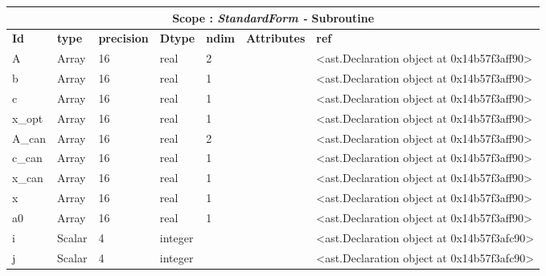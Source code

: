 \documentclass{report}
\begin{document}
\begin{center}
\begin{longtable}{|p{3.5cm}|p{1.5cm}|p{1.5cm}|p{1.5cm}|p{1cm}|p{2cm}|p{4cm}| }
\hline
\multicolumn{7}{|c|}{\textbf{Scope : \qquad}  \textbf{\textit{StandardForm - }Subroutine}}\\ 
\hline
\textbf{Id} & \textbf{type} & \textbf{precision} & \textbf{Dtype} & \textbf{ndim} & \textbf{Attributes} & \textbf{ref} \\\hline

A & Array & 16 & real & 2 &  & <ast.Declaration object at 0x14b57f3aff90> \\\hline

b & Array & 16 & real & 1 &  & <ast.Declaration object at 0x14b57f3aff90> \\\hline

c & Array & 16 & real & 1 &  & <ast.Declaration object at 0x14b57f3aff90> \\\hline

x\_opt & Array & 16 & real & 1 &  & <ast.Declaration object at 0x14b57f3aff90> \\\hline

A\_can & Array & 16 & real & 2 &  & <ast.Declaration object at 0x14b57f3aff90> \\\hline

c\_can & Array & 16 & real & 1 &  & <ast.Declaration object at 0x14b57f3aff90> \\\hline

x\_can & Array & 16 & real & 1 &  & <ast.Declaration object at 0x14b57f3aff90> \\\hline

x & Array & 16 & real & 1 &  & <ast.Declaration object at 0x14b57f3aff90> \\\hline

a0 & Array & 16 & real & 1 &  & <ast.Declaration object at 0x14b57f3aff90> \\\hline

i & Scalar & 4 & integer &  &  & <ast.Declaration object at 0x14b57f3afc90> \\\hline

j & Scalar & 4 & integer &  &  & <ast.Declaration object at 0x14b57f3afc90> \\\hline

\end{longtable}
\end{center}

 \vspace{1cm}
\end{document}
